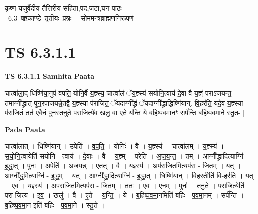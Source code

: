 \documentclass[17pt]{extarticle}
\begin{document}
\begin{titlepage}
    \begin{center}
 
\begin{sanskrit}
    { \Huge
    कृष्ण यजुर्वेदीय तैत्तिरीय संहिता,पद,जटा,घन पाठः 
    }
    \\
    \vspace{2.5cm}
    \mbox{ \Huge
    6.3      षष्ठकाण्डे तृतीयः प्रश्नः - सोममन्त्रब्राह्मणनिरूपणं   }
\end{sanskrit}
\end{center}

\end{titlepage}
\tableofcontents
\pagebreak

\section*{ TS 6.3.1.1 }

\textbf{TS 6.3.1.1 } \newline
\textbf{Samhita Paata} \newline

चात्वा॑ला॒द्-धिष्णि॑या॒नुप॑ वपति॒ योनि॒र्वै य॒ज्ञ्स्य॒ चात्वा॑लं ॅय॒ज्ञ्स्य॑ सयोनि॒त्वाय॑ दे॒वा वै य॒ज्ञ्ं परा॑ऽजयन्त॒ तमाग्नी᳚द्ध्रा॒त् पुन॒रपा॑जयन्ने॒तद्वै य॒ज्ञ्स्या-प॑राजितं॒ ॅयदाग्नी᳚द्ध्रं॒ ॅयदाग्नी᳚द्ध्रा॒द्धिष्णि॑यान्. वि॒हर॑ति॒ यदे॒व  य॒ज्ञ्स्या-प॑राजितं॒ तत॑ ए॒वैनं॒ पुन॑स्तनुते परा॒जित्ये॑व॒ खलु॒ वा ए॒ते य॑न्ति॒ ये ब॑हिष्पवमा॒नꣳ सर्प॑न्ति बहिष्पवमा॒ने स्तु॒त- [  ] \newline

\textbf{Pada Paata} \newline

चात्वा॑लात् । धिष्णि॑यान् । उपेति॑ । व॒प॒ति॒ । योनिः॑ । वै । य॒ज्ञ्स्य॑ । चात्वा॑लम् । य॒ज्ञ्स्य॑ । स॒यो॒नि॒त्वायेति॑ सयोनि - त्वाय॑ । दे॒वाः । वै । य॒ज्ञ्म् । परेति॑ । अ॒ज॒य॒न्त॒ । तम् । आग्नी᳚᳚द्ध्रा॒दित्याग्नि॑ - इ॒द्ध्रा॒त् । पुनः॑ । अपेति॑ । अ॒ज॒य॒न्न् । ए॒तत् । वै । य॒ज्ञ्स्य॑ । अप॑राजित॒मित्यप॑रा - जि॒त॒म् । यत् । आग्नी᳚द्ध्र॒मित्याग्नि॑ - इ॒द्ध्र॒म् । यत् । आग्नी᳚द्ध्रा॒दित्याग्नि॑ - इ॒द्ध्रा॒त् । धिष्णि॑यान् । वि॒हर॒तीति॑ वि-हर॑ति । यत् । ए॒व । य॒ज्ञ्स्य॑ । अप॑राजित॒मित्यप॑रा - जि॒त॒म् । ततः॑ । ए॒व । ए॒न॒म् । पुनः॑ । त॒नु॒ते॒ । प॒रा॒जित्येति॑ परा-जित्य॑ । इ॒व॒ । खलु॑ । वै । ए॒ते । य॒न्ति॒ । ये । ब॒हि॒ष्प॒व॒मा॒नमिति॑ बहिः - प॒व॒मा॒नम् । सर्प॑न्ति । ब॒हि॒ष्प॒व॒मा॒न इति॑ बहिः - प॒व॒मा॒ने । स्तु॒ते ।  \newline
\end{document}
